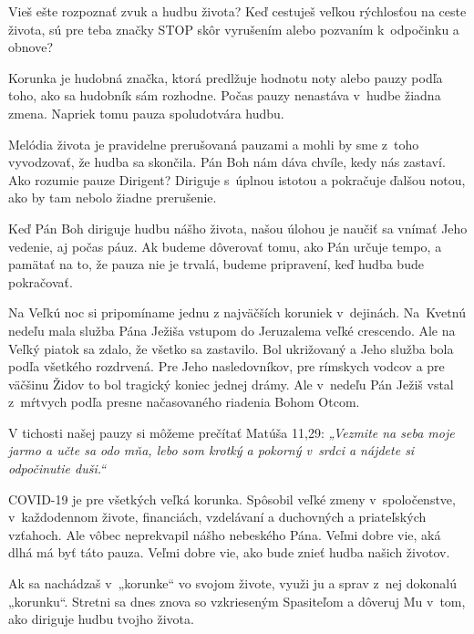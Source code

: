 


Vieš ešte rozpoznať zvuk a hudbu života? Keď cestuješ veľkou rýchlosťou na ceste života, sú pre teba značky STOP skôr vyrušením alebo pozvaním k~odpočinku a obnove?

Korunka je hudobná značka, ktorá predlžuje hodnotu noty alebo pauzy podľa toho, ako sa hudobník sám rozhodne. Počas pauzy nenastáva v~hudbe žiadna zmena. Napriek tomu pauza spoludotvára hudbu.

Melódia života je pravidelne prerušovaná pauzami a mohli by sme z~toho vyvodzovať, že hudba sa skončila. Pán Boh nám dáva chvíle, kedy nás zastaví. Ako rozumie pauze Dirigent? Diriguje s~úplnou istotou a pokračuje ďalšou notou, ako by tam nebolo žiadne prerušenie.

Keď Pán Boh diriguje hudbu nášho života, našou úlohou je naučiť sa vnímať Jeho vedenie, aj počas páuz. Ak budeme dôverovať tomu, ako Pán určuje tempo, a pamätať na to, že pauza nie je trvalá, budeme pripravení, keď hudba bude pokračovať.

Na Veľkú noc si pripomíname jednu z najväčších koruniek v~dejinách. Na~Kvetnú nedeľu mala služba Pána Ježiša vstupom do Jeruzalema veľké crescendo. Ale na Veľký piatok sa zdalo, že všetko sa zastavilo. Bol ukrižovaný a Jeho služba bola podľa všetkého rozdrvená. Pre Jeho nasledovníkov, pre rímskych vodcov a pre väčšinu Židov to bol tragický koniec jednej drámy. Ale v~nedeľu Pán Ježiš vstal z~mŕtvych podľa presne načasovaného riadenia Bohom Otcom.

V tichosti našej pauzy si môžeme prečítať Matúša 11,29: {\it „Vezmite na seba moje jarmo a učte sa odo mňa, lebo som krotký a pokorný v~srdci a nájdete si odpočinutie duši.“}

COVID-19 je pre všetkých veľká korunka. Spôsobil veľké zmeny v~spoločenstve, v~každodennom živote, financiách, vzdelávaní a duchovných a priateľských vzťahoch. Ale vôbec neprekvapil nášho nebeského Pána. Veľmi dobre vie, aká dlhá má byť táto pauza. Veľmi dobre vie, ako bude znieť hudba našich životov.

Ak sa nachádzaš v~„korunke“ vo svojom živote, využi ju a sprav z~nej dokonalú „korunku“. Stretni sa dnes znova so vzkrieseným Spasiteľom a dôveruj Mu v~tom, ako diriguje hudbu tvojho života.

